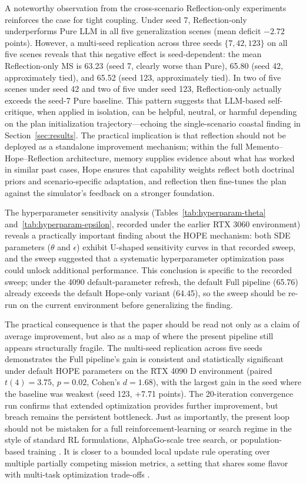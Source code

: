 A noteworthy observation from the cross-scenario Reflection-only experiments reinforces the case for tight coupling. Under seed 7, Reflection-only underperforms Pure LLM in all five generalization scenes (mean deficit $-2.72$ points). However, a multi-seed replication across three seeds $\{7, 42, 123\}$ on all five scenes reveals that this negative effect is seed-dependent: the mean Reflection-only MS is 63.23 (seed 7, clearly worse than Pure), 65.80 (seed 42, approximately tied), and 65.52 (seed 123, approximately tied). In two of five scenes under seed 42 and two of five under seed 123, Reflection-only actually exceeds the seed-7 Pure baseline. This pattern suggests that LLM-based self-critique, when applied in isolation, can be helpful, neutral, or harmful depending on the plan initialization trajectory---echoing the single-scenario coastal finding in Section~\ref{sec:results}. The practical implication is that reflection should not be deployed as a standalone improvement mechanism; within the full Memento--Hope--Reflection architecture, memory supplies evidence about what has worked in similar past cases, Hope ensures that capability weights reflect both doctrinal priors and scenario-specific adaptation, and reflection then fine-tunes the plan against the simulator's feedback on a stronger foundation.

The hyperparameter sensitivity analysis (Tables~\ref{tab:hyperparam-theta} and~\ref{tab:hyperparam-epsilon}, recorded under the earlier RTX 3060 environment) reveals a practically important finding about the HOPE mechanism: both SDE parameters ($\theta$ and $\epsilon$) exhibit U-shaped sensitivity curves in that recorded sweep, and the sweep suggested that a systematic hyperparameter optimization pass could unlock additional performance. This conclusion is specific to the recorded sweep; under the 4090 default-parameter refresh, the default Full pipeline (65.76) already exceeds the default Hope-only variant (64.45), so the sweep should be re-run on the current environment before generalizing the finding.

The practical consequence is that the paper should be read not only as a claim of average improvement, but also as a map of where the present pipeline still appears structurally fragile. The multi-seed replication across five seeds demonstrates the Full pipeline's gain is consistent and statistically significant under default HOPE parameters on the RTX 4090 D environment (paired $t(4)=3.75$, $p=0.02$, Cohen's $d=1.68$), with the largest gain in the seed where the baseline was weakest (seed 123, +7.71 points). The 20-iteration convergence run confirms that extended optimization provides further improvement, but breach remains the persistent bottleneck. Just as importantly, the present loop should not be mistaken for a full reinforcement-learning or search regime in the style of standard RL formulations, AlphaGo-scale tree search, or population-based training \citep{sutton2018rl,silver2016alphago,jaderberg2017pbt}. It is closer to a bounded local update rule operating over multiple partially competing mission metrics, a setting that shares some flavor with multi-task optimization trade-offs \citep{yu2020pcgrad}.

